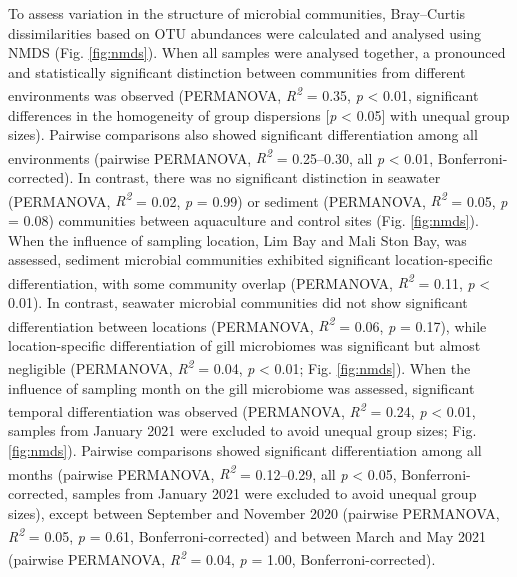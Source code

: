 \documentclass[
  12 pt,
]{article}
\begin{document}
To assess variation in the structure of microbial communities, Bray--Curtis dissimilarities based on OTU abundances were calculated and analysed using NMDS (Fig. \ref{fig:nmds}). When all samples were analysed together, a pronounced and statistically significant distinction between communities from different environments was observed (PERMANOVA, \emph{R\textsuperscript{2}} = 0.35, \emph{p} \textless{} 0.01, significant differences in the homogeneity of group dispersions {[}\emph{p} \textless{} 0.05{]} with unequal group sizes). Pairwise comparisons also showed significant differentiation among all environments (pairwise PERMANOVA, \emph{R\textsuperscript{2}} = 0.25--0.30, all \emph{p} \textless{} 0.01, Bonferroni-corrected). In contrast, there was no significant distinction in seawater (PERMANOVA, \emph{R\textsuperscript{2}} = 0.02, \emph{p} = 0.99) or sediment (PERMANOVA, \emph{R\textsuperscript{2}} = 0.05, \emph{p} = 0.08) communities between aquaculture and control sites (Fig. \ref{fig:nmds}). When the influence of sampling location, Lim Bay and Mali Ston Bay, was assessed, sediment microbial communities exhibited significant location-specific differentiation, with some community overlap (PERMANOVA, \emph{R\textsuperscript{2}} = 0.11, \emph{p} \textless{} 0.01). In contrast, seawater microbial communities did not show significant differentiation between locations (PERMANOVA, \emph{R\textsuperscript{2}} = 0.06, \emph{p} = 0.17), while location-specific differentiation of gill microbiomes was significant but almost negligible (PERMANOVA, \emph{R\textsuperscript{2}} = 0.04, \emph{p} \textless{} 0.01; Fig. \ref{fig:nmds}). When the influence of sampling month on the gill microbiome was assessed, significant temporal differentiation was observed (PERMANOVA, \emph{R\textsuperscript{2}} = 0.24, \emph{p} \textless{} 0.01, samples from January 2021 were excluded to avoid unequal group sizes; Fig. \ref{fig:nmds}). Pairwise comparisons showed significant differentiation among all months (pairwise PERMANOVA, \emph{R\textsuperscript{2}} = 0.12--0.29, all \emph{p} \textless{} 0.05, Bonferroni-corrected, samples from January 2021 were excluded to avoid unequal group sizes), except between September and November 2020 (pairwise PERMANOVA, \emph{R\textsuperscript{2}} = 0.05, \emph{p} = 0.61, Bonferroni-corrected) and between March and May 2021 (pairwise PERMANOVA, \emph{R\textsuperscript{2}} = 0.04, \emph{p} = 1.00, Bonferroni-corrected).
\end{document}
